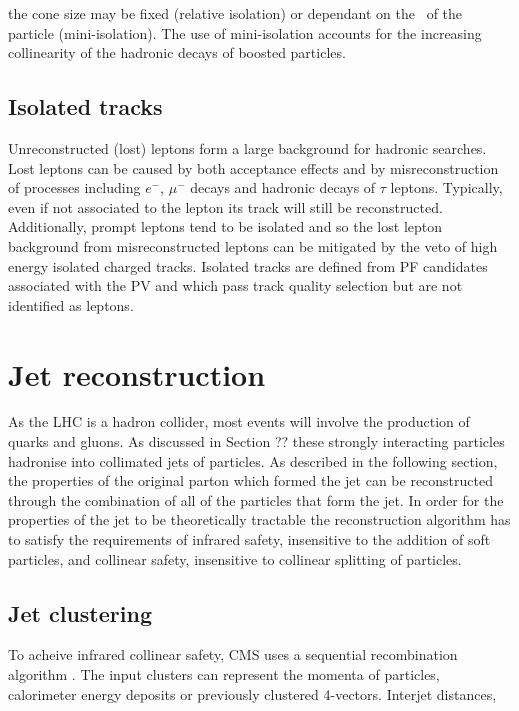 the cone size may be fixed (relative isolation) or dependant on the \pt~of the particle (mini-isolation). The use of mini-isolation
accounts for the increasing collinearity of the hadronic decays of boosted particles. 

\subsection{Isolated tracks}

Unreconstructed (lost) leptons form a large background for hadronic searches. Lost leptons can be caused by both acceptance 
effects and by misreconstruction of processes including $e^{-}$, $\mu^{-}$ decays and hadronic decays of $\tau$ leptons. 
Typically, even if not associated to the lepton its track will still be reconstructed. Additionally, prompt leptons 
tend to be isolated and so the lost lepton background from misreconstructed leptons can be mitigated by the veto of high
energy isolated charged tracks. Isolated tracks are defined from PF candidates associated with the PV and 
which pass track quality selection but are not identified as leptons.

\section{Jet reconstruction} 

As the LHC is a hadron collider, most events will involve the production of quarks and gluons. As discussed in
Section ?? these strongly interacting particles hadronise into collimated jets of particles. As described 
in the following section, the properties  of the original parton which formed the jet can be reconstructed through the combination
of all of the particles that form the jet. In order for the properties of the jet to be theoretically tractable the
reconstruction algorithm has to satisfy the requirements of infrared safety, insensitive to the addition of 
soft particles, and collinear safety, insensitive to collinear splitting of particles.

\subsection{Jet clustering}

To acheive infrared collinear safety, CMS uses a sequential recombination algorithm \cite{antikt}. The input clusters can represent
the momenta of particles, calorimeter energy deposits or previously clustered 4-vectors. Interjet distances,

